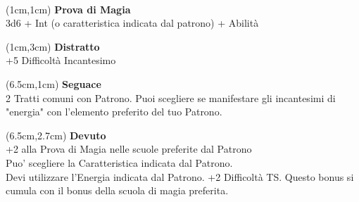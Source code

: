 \documentclass[a4paper,12 pt,openany]{book}
\begin{document}
	~\newpage

\begin{textblock*}{5cm}(1cm,1cm) %
		\textbf{Prova di Magia}\\
3d6 + Int (o caratteristica indicata dal patrono) + Abilità		
	\end{textblock*}

\begin{textblock*}{5cm}(1cm,3cm) %
	\textbf{Distratto}\\
	+5 Difficoltà Incantesimo
\end{textblock*}

\begin{textblock*}{13.5cm}(6.5cm,1cm) %
	\textbf{Seguace}\\
2 Tratti comuni con Patrono. Puoi scegliere se manifestare gli incantesimi di "energia" con l'elemento preferito del tuo Patrono.\\
\end{textblock*}

\begin{textblock*}{13.5cm}(6.5cm,2.7cm) %
	\textbf{Devuto}\\
+2 alla Prova di Magia nelle scuole preferite dal Patrono\\
Puo' scegliere la Caratteristica indicata dal Patrono.\\
Devi utilizzare l'Energia indicata dal Patrono. +2 Difficoltà TS. Questo bonus si cumula con il bonus della scuola di magia preferita.
\end{textblock*}
	

	 

	
\end{document}
